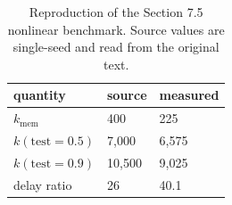 \begin{table}
\caption{Reproduction of the Section 7.5 nonlinear benchmark. Source values are single-seed and read from the original text.}
\label{tab:reproduction}
\begin{tabular}{lll}
\toprule
quantity & source & measured \\
\midrule
$k_{\mathrm{mem}}$ & 400 & 225 \\
$k(\mathrm{test}=0.5)$ & 7,000 & 6,575 \\
$k(\mathrm{test}=0.9)$ & 10,500 & 9,025 \\
delay ratio & 26 & 40.1 \\
\bottomrule
\end{tabular}
\end{table}
